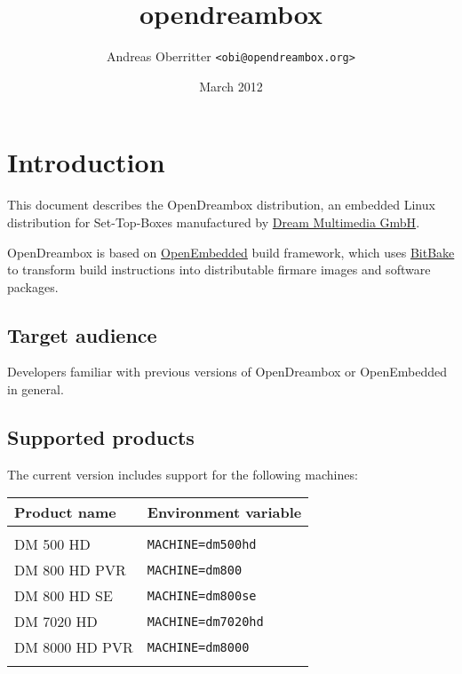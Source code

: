 \documentclass[a4paper]{article}
\newcommand{\shell}[1]{\texttt{\small #1}}
\begin{document}
\title{opendreambox}
\author{Andreas Oberritter \shell{<obi@opendreambox.org>}}
\date{March 2012}
\maketitle
\tableofcontents
\pagebreak

\section{Introduction}
  \begin{flushleft}
    This document describes the OpenDreambox distribution, an embedded Linux
    distribution for Set-Top-Boxes manufactured by \href{http://www.dream-multimedia-tv.de/}{Dream Multimedia GmbH}.

    OpenDreambox is based on \href{http://www.openembedded.org/}{OpenEmbedded} build framework, which
    uses \href{http://bitbake.berlios.de/}{BitBake} to transform build instructions into
    distributable firmare images and software packages.
  \end{flushleft}

  \subsection{Target audience}
    \begin{flushleft}
      Developers familiar with previous versions of OpenDreambox or OpenEmbedded
      in general.
    \end{flushleft}

  \subsection{Supported products}
    \label{products}
    \begin{flushleft}
      The current version includes support for the following machines:

        \begin{tabular}{ | l | l | }
          \hline
          \textbf{Product name} & \textbf{Environment variable} \\ \hline
          & \\
          DM 500 HD & \shell{MACHINE=dm500hd} \\
          DM 800 HD PVR & \shell{MACHINE=dm800} \\
          DM 800 HD SE & \shell{MACHINE=dm800se} \\
          DM 7020 HD & \shell{MACHINE=dm7020hd} \\
          DM 8000 HD PVR & \shell{MACHINE=dm8000} \\
          & \\
          \hline
        \end{tabular}
    \end{flushleft}
\end{document}
